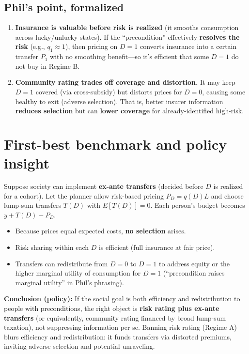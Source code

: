 \documentclass[12pt]{article}
\theoremstyle{plain}
\theoremstyle{plain}
\begin{document}
\subsection*{Phil's point, formalized}
\begin{enumerate}
    \item \textbf{Insurance is valuable before risk is realized} (it smooths consumption across lucky/unlucky states). If the ``precondition'' effectively \textbf{resolves the risk} (e.g., $q_1 \approx 1$), then pricing on $D=1$ converts insurance into a certain transfer $P_1$ with no smoothing benefit---so it's efficient that some $D=1$ do not buy in Regime B.
    \item \textbf{Community rating trades off coverage and distortion.} It may keep $D=1$ covered (via cross-subsidy) but distorts prices for $D=0$, causing some healthy to exit (adverse selection). That is, better insurer information \textbf{reduces selection} but can \textbf{lower coverage} for already-identified high-risk.
\end{enumerate}

\section*{First-best benchmark and policy insight}

Suppose society can implement \textbf{ex-ante transfers} (decided before $D$ is realized for a cohort). Let the planner allow risk-based pricing $P_D = q(D)L$ and choose lump-sum transfers $T(D)$ with $E[T(D)] = 0$. Each person's budget becomes $y + T(D) - P_D$.
\begin{itemize}
    \item Because prices equal expected costs, \textbf{no selection} arises.
    \item Risk sharing within each $D$ is efficient (full insurance at fair price).
    \item Transfers can redistribute from $D=0$ to $D=1$ to address equity or the higher marginal utility of consumption for $D=1$ (``precondition raises marginal utility'' in Phil's phrasing).
\end{itemize}
\textbf{Conclusion (policy):} If the social goal is both efficiency and redistribution to people with preconditions, the right object is \textbf{risk rating plus ex-ante transfers} (or equivalently, community rating financed by broad lump-sum taxation), not suppressing information per se. Banning risk rating (Regime A) blurs efficiency and redistribution: it funds transfers via distorted premiums, inviting adverse selection and potential unraveling.
\end{document}
